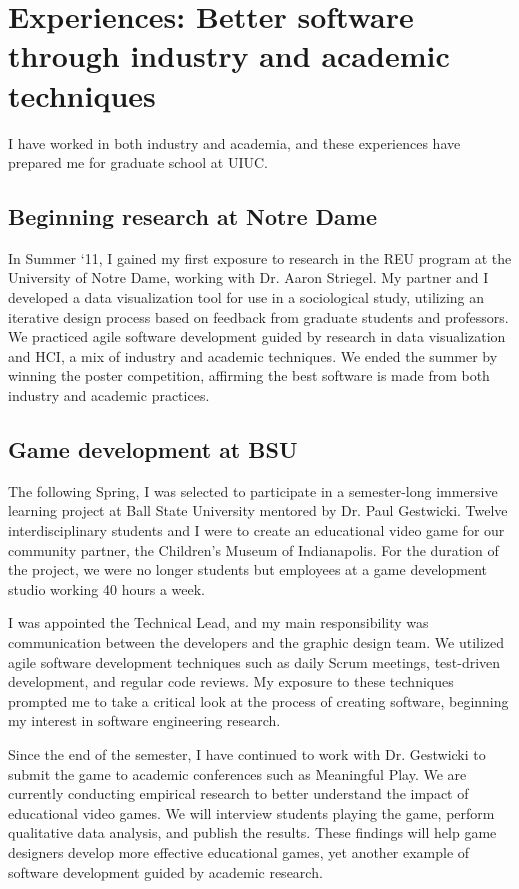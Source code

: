 \section*{Experiences: Better software through industry and academic techniques}
I have worked in both industry and academia, and these experiences have prepared me for graduate school at UIUC.

\subsection{Beginning research at Notre Dame}
In Summer ‘11, I gained my first exposure to research in the REU program at the University of Notre Dame, working with Dr. Aaron Striegel. 
My partner and I developed a data visualization tool for use in a sociological study, utilizing an iterative design process based on feedback from graduate students and professors. 
We practiced agile software development guided by research in data visualization and HCI, a mix of industry and academic techniques. 
We ended the summer by winning the poster competition, affirming the best software is made from both industry and academic practices.

\subsection{Game development at BSU}
The following Spring, I was selected to participate in a semester-long immersive learning project at Ball State University mentored by Dr. Paul Gestwicki. 
Twelve interdisciplinary students and I were to create an educational video game for our community partner, the Children’s Museum of Indianapolis. 
For the duration of the project, we were no longer students but employees at a game development studio working 40 hours a week. 

I was appointed the Technical Lead, and my main responsibility was communication between the developers and the graphic design team. 
We utilized agile software development techniques such as daily Scrum meetings, test-driven development, and regular code reviews. 
My exposure to these techniques prompted me to take a critical look at the process of creating software, beginning my interest in software engineering research.

Since the end of the semester, I have continued to work with Dr. Gestwicki to submit the game to academic conferences such as Meaningful Play. 
We are currently conducting empirical research to better understand the impact of educational video games. 
We will interview students playing the game, perform qualitative data analysis, and publish the results. 
These findings will help game designers develop more effective educational games, yet another example of software development guided by academic research.

